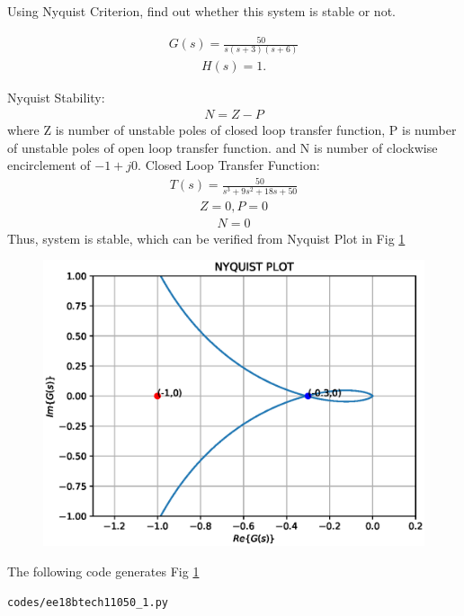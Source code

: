 \item Using Nyquist Criterion, find out whether this system is stable or not.

\begin{align}
    G(s) = \frac{50}{s(s+3)(s+6)}
    \label{eq:ee18btech11050_1}
\end{align}
\begin{align}
    H(s) = 1.
    \label{eq:ee18btech11050_2}
\end{align}


Nyquist Stability:
\begin{align}
    N = Z -P
\end{align}
where Z is number of unstable poles of closed loop transfer function, P is number of unstable poles of open loop transfer function.
and N is number of clockwise encirclement of $-1+j0.$
Closed Loop Transfer Function:
\begin{align}
    T(s) = \frac{50}{s^3+9s^2+18s+50}
\end{align}
\begin{align}
    Z = 0, P = 0
\end{align}
\begin{align}
    N = 0
\end{align}
Thus, system is stable, which can be verified from Nyquist Plot in Fig \ref{fig:ee18btech11050_fig1}

\begin{figure}[!ht]
\centering
\includegraphics[width=\columnwidth]{./figs/ee18btech11050_1.eps}
\caption{}
\label{fig:ee18btech11050_fig1}
\end{figure}

The following code generates Fig \ref{fig:ee18btech11050_fig1}
\begin{lstlisting}
codes/ee18btech11050_1.py
\end{lstlisting}

